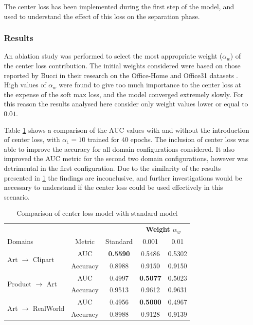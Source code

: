\documentclass[10pt,twocolumn,letterpaper]{article}
\begin{document}
The center loss has been implemented during the first step of the model, and used to understand the effect of this loss on the separation phase.

\subsubsection*{Results}

An ablation study was performed to select the most appropriate weight ($\alpha_w$) of the center loss contribution. The initial weights considered were based on those reported by Bucci \etal \cite{Bucci2020} in their research on the Office-Home \cite{OfficeHome} and Office31 datasets \cite{Office31}. High values of $\alpha_w$ were found to give too much importance to the center loss at the expense of the soft max loss, and the model converged extremely slowly. For this reason the results analysed here consider only weight values lower or equal to $0.01$.

Table \ref{tab:center_loss} shows a comparison of the AUC values with and without the introduction of center loss, with $\alpha_1 = 10$ trained for 40 epochs. The inclusion of center loss was able to improve the accuracy for all domain configurations considered. It also improved the AUC metric for the second two domain configurations, however was detrimental in the first configuration. Due to the similarity of the results presented in \ref{tab:center_loss} the findings are inconclusive, and further investigations would be necessary to understand if the center loss could be used effectively in this scenario.

\begin{table}[!htbp]
	\centering
	\small
	\begin{tabular}{|l|c|c|c|c|}
		\hline
		 & & & \multicolumn{2}{c|}{\textbf{Weight  $\alpha_w$}} \\
		Domains & Metric & Standard & 0.001 & 0.01\\
		\hline
		\multirow{2}{*}{Art $\to$ Clipart}
		& AUC & \textbf{0.5590} & 0.5486 & 0.5302\\ 
		& Accuracy & 0.8988 & 0.9150 & 0.9150\\
		\hline
		\multirow{2}{*}{Product $\to$ Art}
		& AUC & 0.4997 & \textbf{0.5077} & 0.5023\\ 
		& Accuracy & 0.9513 & 0.9612 & 0.9631\\
		\hline
		\multirow{2}{*}{Art $\to$ RealWorld}
		& AUC & 0.4956 & \textbf{0.5000} & 0.4967\\ 
		& Accuracy & 0.8988 & 0.9128 & 0.9139\\
		\hline
	\end{tabular}
	\caption{Comparison of center loss model with standard model}
	\label{tab:center_loss}
\end{table}
\end{document}
